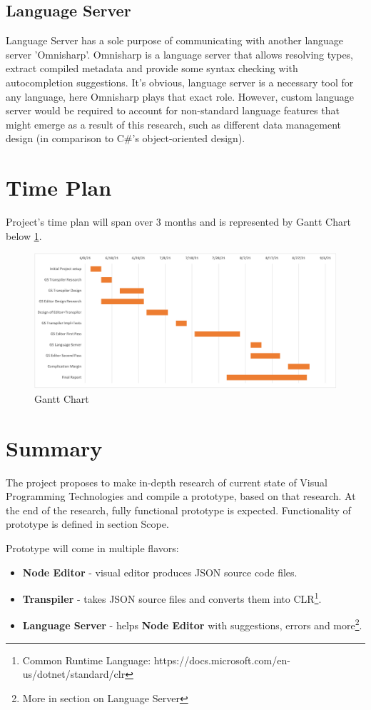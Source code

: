 \documentclass{article}
\begin{document}
\subsection*{Language Server}
Language Server has a sole purpose of communicating with another language server 'Omnisharp'. Omnisharp is a language server that allows resolving types, extract compiled metadata and provide some syntax checking with autocompletion suggestions. It's obvious, language server is a necessary tool for any language, here Omnisharp plays that exact role.
However, custom language server would be required to account for non-standard language features that might emerge as a result of this research, such as different data management design (in comparison to C\#'s object-oriented design).

\section{Time Plan}
Project's time plan will span over 3 months and is represented by Gantt Chart below \ref{fig:gantt}.

\begin{figure}[H]
\centering
\includegraphics[width=1\textwidth]{Gantt.png}
\caption{Gantt Chart}
\label{fig:gantt}
\end{figure}

\section{Summary}
The project proposes to make in-depth research of current state of Visual Programming Technologies and compile a prototype, based on that research.
At the end of the research, fully functional prototype is expected. Functionality of prototype is defined in section Scope.

Prototype will come in multiple flavors: 
\begin{itemize}
  \item \textbf{Node Editor} - visual editor produces JSON source code files.
  \item \textbf{Transpiler} - takes JSON source files and converts them into CLR\footnote{Common Runtime Language: https://docs.microsoft.com/en-us/dotnet/standard/clr}.
  \item \textbf{Language Server} - helps \textbf{Node Editor} with suggestions, errors and more\footnote{More in section on Language Server}.
\end{itemize}





\end{document}
